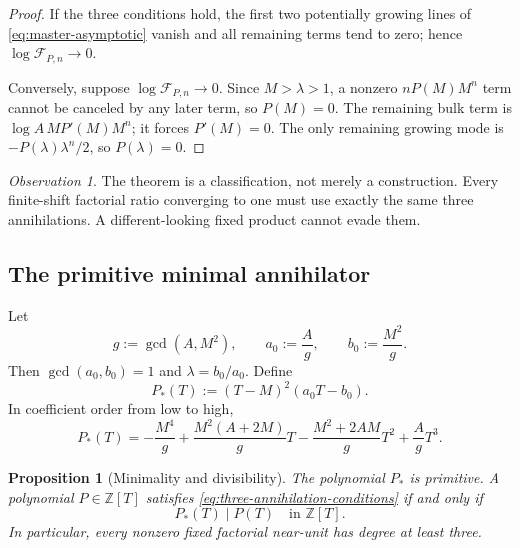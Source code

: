 \documentclass[11pt,oneside]{article}
\newtheorem{proposition}[theorem]{Proposition}
\theoremstyle{definition}
\theoremstyle{remark}
\newtheorem{observation}[theorem]{Observation}
\newcommand{\Z}{\mathbb Z}
\newcommand{\cF}{\mathcal F}
\begin{document}
\begin{proof}
If the three conditions hold, the first two potentially growing lines of
\eqref{eq:master-asymptotic} vanish and all remaining terms tend to zero; hence
$\log\cF_{P,n}\to0$.

Conversely, suppose $\log\cF_{P,n}\to0$.  Since $M>\lambda>1$, a nonzero
$nP(M)M^n$ term cannot be canceled by any later term, so $P(M)=0$.  The remaining bulk term
is $\log A\,MP'(M)M^n$; it forces $P'(M)=0$.  The only remaining growing mode is
$-P(\lambda)\lambda^n/2$, so $P(\lambda)=0$.
\end{proof}

\begin{observation}
The theorem is a classification, not merely a construction.  Every finite-shift factorial
ratio converging to one must use exactly the same three annihilations.  A different-looking
fixed product cannot evade them.
\end{observation}

\subsection{The primitive minimal annihilator}

Let
\begin{equation}
 g:=\gcd(A,M^2),
 \qquad a_0:=\frac Ag,
 \qquad b_0:=\frac{M^2}{g}.
 \label{eq:g-a0-b0}
\end{equation}
Then $\gcd(a_0,b_0)=1$ and $\lambda=b_0/a_0$.  Define
\begin{equation}
 P_*(T):=(T-M)^2(a_0T-b_0).
 \label{eq:Pstar}
\end{equation}
In coefficient order from low to high,
\begin{equation}
 P_*(T)=
 -\frac{M^4}{g}
 +\frac{M^2(A+2M)}{g}T
 -\frac{M^2+2AM}{g}T^2
 +\frac AgT^3.
 \label{eq:Pstar-coefficients}
\end{equation}

\begin{proposition}[Minimality and divisibility]
\label{prop:Pstar-minimal}
The polynomial $P_*$ is primitive.  A polynomial $P\in\Z[T]$ satisfies
\eqref{eq:three-annihilation-conditions} if and only if
\begin{equation}
 P_*(T)\mid P(T)\quad\text{in }\Z[T].
 \label{eq:Pstar-divides}
\end{equation}
In particular, every nonzero fixed factorial near-unit has degree at least three.
\end{proposition}
\end{document}
